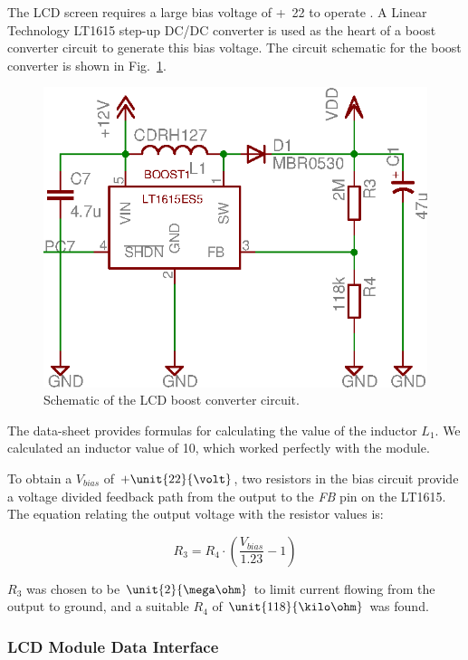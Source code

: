 The LCD screen requires a large bias voltage of \unit{+22}{\volt} to operate \cite{LCD_Module}. A Linear Technology LT1615 step-up DC/DC converter is used as the heart of a boost converter circuit to generate this bias voltage. The circuit schematic for the boost converter is shown in Fig.\ \ref{fig:lcd_boost_converter}.

\begin{figure}[htp]
 \centering
 \includegraphics[scale=0.8]{implementation/figures/driver_interface_lcd_bias_circuit.eps}
 \caption{Schematic of the LCD boost converter circuit.}
 \label{fig:lcd_boost_converter}
\end{figure}

The data-sheet provides formulas for calculating the value of the inductor $L_1$. We calculated an inductor value of \unit{10}{\micro\henry}, which worked perfectly with the module.

To obtain a $V_{bias}$ of $+\unit{22}{\volt}$, two resistors in the bias circuit provide a voltage divided feedback path from the output to the \emph{FB} pin on the LT1615. The equation relating the output voltage with the resistor values is:

\begin{equation}
R_{3}=R_{4}\cdot\left(\frac{V_{bias}}{1.23}-1\right)
\end{equation}

 $R_{3}$ was chosen to be $\unit{2}{\mega\ohm}$ to limit current flowing from the output to ground, and a suitable $R_{4}$ of $\unit{118}{\kilo\ohm}$ was found.

\subsubsection{LCD Module Data Interface\label{sec:lcd_module_data_interface}}

